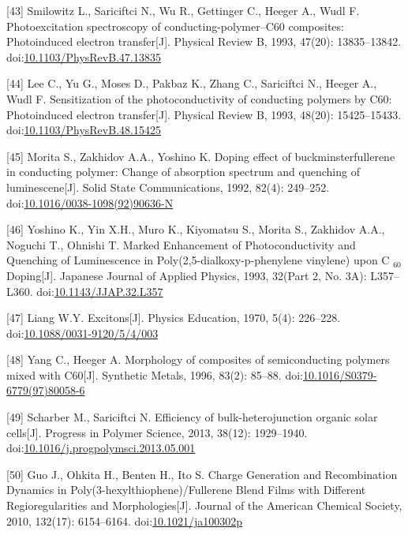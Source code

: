\documentclass[12pt,]{report}
\begin{document}
{[}43{]} Smilowitz L., Sariciftci N., Wu R., Gettinger C., Heeger A.,
Wudl F. Photoexcitation spectroscopy of conducting-polymer--C60
composites: Photoinduced electron transfer{[}J{]}. Physical Review B,
1993, 47(20): 13835--13842.
doi:\href{http://dx.doi.org/10.1103/PhysRevB.47.13835}{10.1103/PhysRevB.47.13835}

{[}44{]} Lee C., Yu G., Moses D., Pakbaz K., Zhang C., Sariciftci N.,
Heeger A., Wudl F. Sensitization of the photoconductivity of conducting
polymers by C60: Photoinduced electron transfer{[}J{]}. Physical Review
B, 1993, 48(20): 15425--15433.
doi:\href{http://dx.doi.org/10.1103/PhysRevB.48.15425}{10.1103/PhysRevB.48.15425}

{[}45{]} Morita S., Zakhidov A.A., Yoshino K. Doping effect of
buckminsterfullerene in conducting polymer: Change of absorption
spectrum and quenching of luminescene{[}J{]}. Solid State
Communications, 1992, 82(4): 249--252.
doi:\href{http://dx.doi.org/10.1016/0038-1098(92)90636-N}{10.1016/0038-1098(92)90636-N}

{[}46{]} Yoshino K., Yin X.H., Muro K., Kiyomatsu S., Morita S.,
Zakhidov A.A., Noguchi T., Ohnishi T. Marked Enhancement of
Photoconductivity and Quenching of Luminescence in
Poly(2,5-dialkoxy-p-phenylene vinylene) upon C \(_{\textrm{60}}\)
Doping{[}J{]}. Japanese Journal of Applied Physics, 1993, 32(Part 2, No.
3A): L357--L360.
doi:\href{http://dx.doi.org/10.1143/JJAP.32.L357}{10.1143/JJAP.32.L357}

{[}47{]} Liang W.Y. Excitons{[}J{]}. Physics Education, 1970, 5(4):
226--228.
doi:\href{http://dx.doi.org/10.1088/0031-9120/5/4/003}{10.1088/0031-9120/5/4/003}

{[}48{]} Yang C., Heeger A. Morphology of composites of semiconducting
polymers mixed with C60{[}J{]}. Synthetic Metals, 1996, 83(2): 85--88.
doi:\href{http://dx.doi.org/10.1016/S0379-6779(97)80058-6}{10.1016/S0379-6779(97)80058-6}

{[}49{]} Scharber M., Sariciftci N. Efficiency of bulk-heterojunction
organic solar cells{[}J{]}. Progress in Polymer Science, 2013, 38(12):
1929--1940.
doi:\href{http://dx.doi.org/10.1016/j.progpolymsci.2013.05.001}{10.1016/j.progpolymsci.2013.05.001}

{[}50{]} Guo J., Ohkita H., Benten H., Ito S. Charge Generation and
Recombination Dynamics in Poly(3-hexylthiophene)/Fullerene Blend Films
with Different Regioregularities and Morphologies{[}J{]}. Journal of the
American Chemical Society, 2010, 132(17): 6154--6164.
doi:\href{http://dx.doi.org/10.1021/ja100302p}{10.1021/ja100302p}
\end{document}
